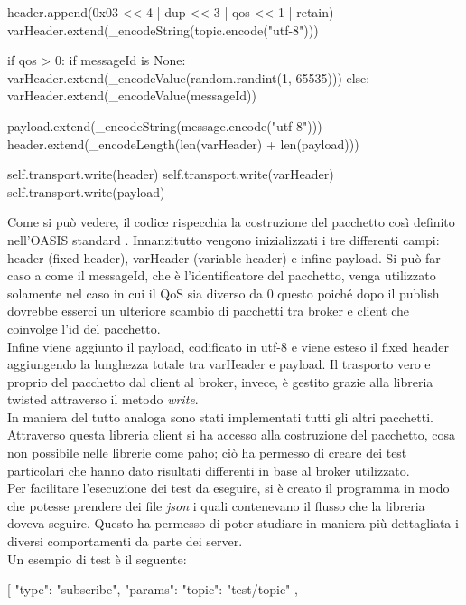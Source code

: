 \documentclass[binding=0.6cm,TFA]{sapthesis}
\begin{document}
\begin{large}
\begin{python}
    header.append(0x03 << 4 | dup << 3 | qos << 1 | retain)
    varHeader.extend(_encodeString(topic.encode("utf-8")))
    
    if qos > 0:
    	if messageId is None:
    		varHeader.extend(_encodeValue(random.randint(1, 65535)))
    	else:
    		varHeader.extend(_encodeValue(messageId))
    
    payload.extend(_encodeString(message.encode("utf-8")))
    header.extend(_encodeLength(len(varHeader) + len(payload)))
    
    self.transport.write(header)
    self.transport.write(varHeader)
    self.transport.write(payload)
\end{python}

Come si può vedere, il codice rispecchia la costruzione del pacchetto così definito nell'OASIS standard \cite{oasis:publish}. Innanzitutto vengono inizializzati i tre differenti campi: header (fixed header), varHeader (variable header) e infine payload. Si può far caso a come il messageId, che è l'identificatore del pacchetto, venga utilizzato solamente nel caso in cui il QoS sia diverso da 0 questo poiché dopo il publish dovrebbe esserci un ulteriore scambio di pacchetti tra broker e client che coinvolge l'id del pacchetto. \\
Infine viene aggiunto il payload, codificato in utf-8 e viene esteso il fixed header aggiungendo la lunghezza totale tra varHeader e payload. Il trasporto vero e proprio del pacchetto dal client al broker, invece, è gestito grazie alla libreria twisted attraverso il metodo \textit{write}. \\

In maniera del tutto analoga sono stati implementati tutti gli altri pacchetti. Attraverso questa libreria client si ha accesso alla costruzione del pacchetto, cosa non possibile nelle librerie come paho; ciò ha permesso di creare dei test particolari che hanno dato risultati differenti in base al broker utilizzato. \\

Per facilitare l'esecuzione dei test da eseguire, si è creato il programma in modo che potesse prendere dei file \textit{json} i quali contenevano il flusso che la libreria doveva seguire. Questo ha permesso di poter studiare in maniera più dettagliata i diversi comportamenti da parte dei server. \\
Un esempio di test è il seguente:
\begin{python}
[   
    {
       "type": "subscribe",
       "params": {
           "topic": "test/topic"
       }     
    },


\end{python}
\end{large}
\end{document}
